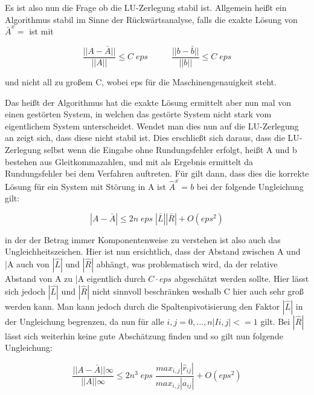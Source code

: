 \documentclass[course=erap]{aspdoc}
\begin{document}
Es ist also nun die Frage ob die LU-Zerlegung stabil ist. Allgemein heißt ein Algorithmus 
stabil im Sinne der Rückwärtsanalyse, falls  die exakte Lösung von $\bar{A}^x =$ ist mit 							%

 \begin{equation}
\label{norm}
\frac{|| A - \bar{A}||}{||A||} \leq C \; eps \;\; \;\;\;\;\;\;\;\;  \frac{|| b - \bar{b}||}{||b||} \leq C \; eps
\end{equation}

 und nicht all zu großem C, wobei eps für die Maschinengenauigkeit steht.

Das heißt der Algorithmus hat die exakte Lösung ermittelt aber nun mal von einen
gestörten System, in welchen das gestörte System nicht stark vom eigentlichem 
System unterscheidet.
Wendet man dies nun auf die LU-Zerlegung an zeigt sich, dass diese nicht stabil ist. 
Dies erschließt sich daraus, dass die LU-Zerlegung selbst wenn die Eingabe ohne 
Rundungsfehler erfolgt, heißt A und b bestehen aus Gleitkommazahlen,  und  mit 
 als Ergebnis ermittelt da Rundungsfehler bei dem Verfahren auftreten. Für  gilt 
dann, dass dies die korrekte Lösung für ein System mit Störung in A ist $\hat{A}^x=b$ bei der 
folgende Ungleichung gilt:

 \begin{equation}
\label{eg3}
|A - \bar{A}| \leq 2n \; eps \; |\bar{L}||\bar{R}| + O(eps^2)
\end{equation}


in der der 
Betrag immer Komponentenweise zu verstehen ist also auch das Ungleichheitszeichen.										%
Hier ist nun ersichtlich, dass der Abstand zwischen A und \bar{A} auch von $|\hat{L}|$ und $|\hat{R}|$
abhängt, was problematisch wird, da der relative Abstand von A zu \bar{A} eigentlich durch 
$C\cdot eps$ abgeschätzt werden sollte. Hier lässt sich jedoch $|\hat{L}|$ und $|\hat{R}|$ nicht sinnvoll 
beschränken weshalb C hier auch sehr groß werden kann.
Man kann jedoch durch die Spaltenpivotisierung den Faktor $|\hat{L}|$ in der Ungleichung 
begrenzen, da nun für alle $i,j = 0,...,n |Ii,j| <= 1$ gilt. Bei $|\hat{R}|$ lässt sich weiterhin keine gute 
Abschätzung finden und so gilt nun folgende Ungleichung:  

 \begin{equation}
\label{eg3}
\frac{||A - \bar{A}||\infty}{||A||\infty} \leq 2n^3 \; eps \;\frac{max_{i,j}| \hat{r}_{ij}|}{max_{i,j}|a_{ij}|} + O(eps^2)
\end{equation}
\end{document}
